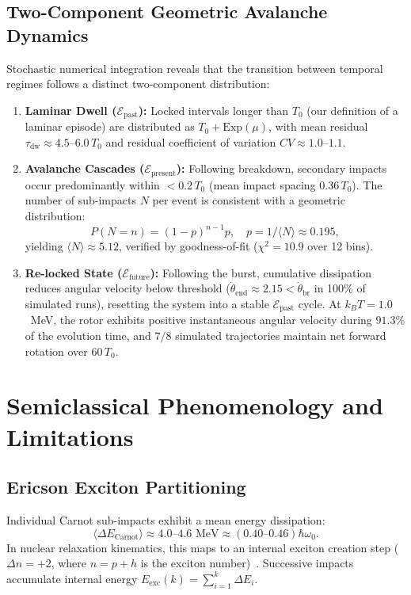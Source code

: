 \documentclass[aps,prc,twocolumn,superscriptaddress,amsmath,amssymb,nofootinbib]{revtex4-2}
\begin{document}
\subsection{Two-Component Geometric Avalanche Dynamics}
Stochastic numerical integration reveals that the transition between temporal regimes follows a distinct two-component distribution:
\begin{enumerate}
    \item \textbf{Laminar Dwell (\(\mathcal{E}_{\text{past}}\)):} Locked intervals longer than \(T_0\) (our definition of a laminar episode) are distributed as \(T_0 + \mathrm{Exp}(\mu)\), with mean residual \(\tau_{\text{dw}} \approx 4.5\text{--}6.0\,T_0\) and residual coefficient of variation \(CV \approx 1.0\text{--}1.1\).
    \item \textbf{Avalanche Cascades (\(\mathcal{E}_{\text{present}}\)):} Following breakdown, secondary impacts occur predominantly within \(< 0.2\,T_0\) (mean impact spacing \(0.36\,T_0\)). The number of sub-impacts \(N\) per event is consistent with a geometric distribution:
    \begin{equation}
    P(N = n) = (1 - p)^{n-1} p, \quad p = 1/\langle N \rangle \approx 0.195,
    \end{equation}
    yielding \(\langle N \rangle \approx 5.12\), verified by goodness-of-fit (\(\chi^2 = 10.9\) over 12 bins).
    \item \textbf{Re-locked State (\(\mathcal{E}_{\text{future}}\)):} Following the burst, cumulative dissipation reduces angular velocity below threshold (\(\dot{\theta}_{\text{end}} \approx 2.15 < \dot{\theta}_{\text{br}}\) in 100\% of simulated runs), resetting the system into a stable \(\mathcal{E}_{\text{past}}\) cycle. At \(k_B T = 1.0\)~MeV, the rotor exhibits positive instantaneous angular velocity during \(91.3\%\) of the evolution time, and \(7/8\) simulated trajectories maintain net forward rotation over \(60\,T_0\).
\end{enumerate}

\section{Semiclassical Phenomenology and Limitations}

\subsection{Ericson Exciton Partitioning}
Individual Carnot sub-impacts exhibit a mean energy dissipation:
\begin{equation}
\langle \Delta E_{\text{Carnot}} \rangle \approx 4.0\text{--}4.6\text{ MeV} \approx (0.40\text{--}0.46)\hbar\omega_0.
\end{equation}
In nuclear relaxation kinematics, this maps to an internal exciton creation step (\(\Delta n = +2\), where \(n = p+h\) is the exciton number)~\cite{Griffin1966,Gadioli1992}. Successive impacts accumulate internal energy \(E_{\text{exc}}(k) = \sum_{i=1}^k \Delta E_i\).
\end{document}
